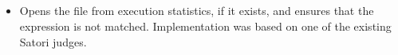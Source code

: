 \subsection*{}\label{subsec:PSQLErrorPostcondition}
\begin{itemize}[label={}]
    \item Opens the  file from execution statistics, if it exists, and ensures that the
           expression is not matched.
          Implementation was based on one of the existing Satori judges.
\end{itemize}

